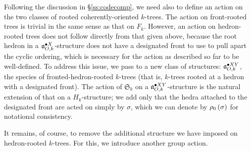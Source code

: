 \documentclass[sectionflow,singlespace,twoside]{brandiss} %
\numberwithin{section}{chapter}
\numberwithin{figure}{chapter}
\begin{document}
Following the discussion in \S \ref{ss:codecomp}, we need also to define an action on the two classes of rooted coherently-oriented $k$-trees.
The action on front-rooted trees is trivial in the same sense as that on $F_{k}$.
However, an action on hedron-rooted trees does not follow directly from that given above, because the root hedron in a $\pointed[X]{\mathfrak{a}}_{O, k}$-structure does not have a designated front to use to pull apart the cyclic ordering, which is necessary for the action as described so far to be well-defined.
To address this issue, we pass to a new class of structures: $\pointed[XY]{\mathfrak{a}}_{O, k}$, the species of fronted-hedron-rooted $k$-trees (that is, $k$-trees rooted at a hedron with a designated front).
The action of $\mathfrak{S}_{k}$ on a $\pointed[XY]{\mathfrak{a}}_{O, k}$-structure is the natural extension of that on a $H_{k}$-structure; we add only that the hedra attached to the designated front are acted on simply by $\sigma$, which we can denote by $\rho_{0} \pbrac{\sigma}$ for notational consistency.

It remains, of course, to remove the additional structure we have imposed on hedron-rooted $k$-trees.
For this, we introduce another group action.
\end{document}
